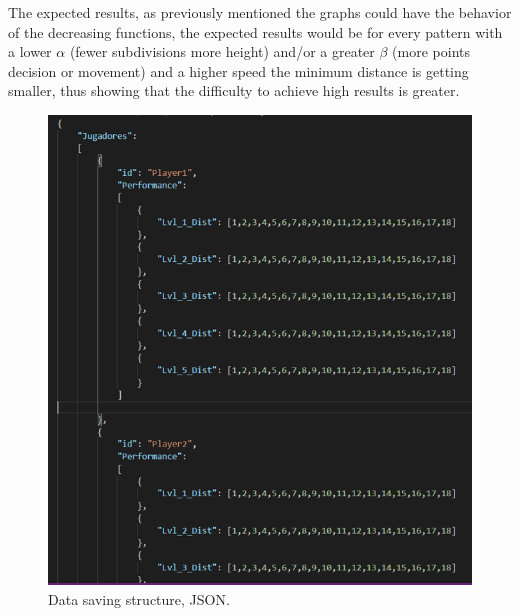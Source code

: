 The expected results, as previously mentioned the graphs could have the behavior of the decreasing functions, the expected results would be for every pattern with a lower $\alpha$ (fewer subdivisions more height) and/or a greater $\beta$ (more points decision or movement) and a higher speed the minimum distance is getting smaller, thus showing that the difficulty to achieve high results is greater.

\begin{figure}[ht]
    \centering
      \includegraphics[width=\linewidth]{Figures/json.png}
      \caption{Data saving structure, JSON.}
    \label{fig:example}
\end{figure}

\newpage


